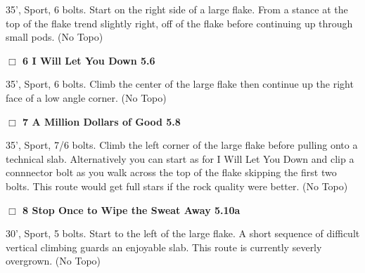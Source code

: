 \begin{multicols}{2}
\begin{adjustwidth}{1.3em}{}
35', Sport, 6 bolts. Start on the right side of a large flake. From a stance at the top of the flake trend slightly right, off of the flake before continuing up through small pods.
  (No Topo)
\end{adjustwidth}




\needspace{2em}
\label{rt:I Will Let You Down}
\colorbox{green!20}{
\parbox{0.95\linewidth}{
\hspace{-1ex}\textbf{$\Box$
6 I Will Let You Down 5.6  
}}}
\begin{adjustwidth}{1.3em}{}			

35', Sport, 6 bolts. Climb the center of the large flake then continue up the right face of a low angle corner.
  (No Topo)
\end{adjustwidth}




\needspace{2em}
\label{rt:A Million Dollars of Good}
\colorbox{green!20}{
\parbox{0.95\linewidth}{
\hspace{-1ex}\textbf{$\Box$
7 A Million Dollars of Good 5.8  
}}}
\begin{adjustwidth}{1.3em}{}			

35', Sport, 7/6 bolts. Climb the left corner of the large flake before pulling onto a technical slab. Alternatively you can start as for I Will Let You Down and clip a connnector bolt as you walk across the top of the flake skipping the first two bolts. This route would get full stars if the rock quality were better.
  (No Topo)
\end{adjustwidth}




\needspace{2em}
\label{rt:Stop Once to Wipe the Sweat Away}
\colorbox{RoyalBlue!20}{
\parbox{0.95\linewidth}{
\hspace{-1ex}\textbf{$\Box$
8 Stop Once to Wipe the Sweat Away 5.10a  
}}}
\begin{adjustwidth}{1.3em}{}			

30', Sport, 5 bolts. Start to the left of the large flake. A short sequence of difficult vertical climbing guards an enjoyable slab. This route is currently severly overgrown.
  (No Topo)
\end{adjustwidth}






\end{multicols}
\clearpage